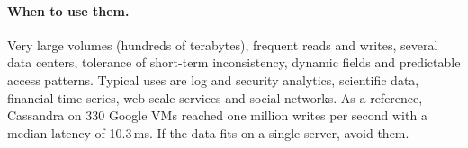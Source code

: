 \paragraph{When to use them.} Very large volumes (hundreds of terabytes), frequent reads and writes, several data centers, tolerance of short-term inconsistency, dynamic fields and predictable access patterns. Typical uses are log and security analytics, scientific data, financial time series, web-scale services and social networks. As a reference, Cassandra on 330 Google VMs reached one million writes per second with a median latency of 10.3\,ms. If the data fits on a single server, avoid them.
